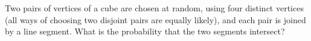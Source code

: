 Two pairs of vertices of a cube are chosen at random, using four distinct vertices (all ways of choosing two disjoint pairs are equally likely), and each pair is joined by a line segment. What is the probability that the two segments intersect?

